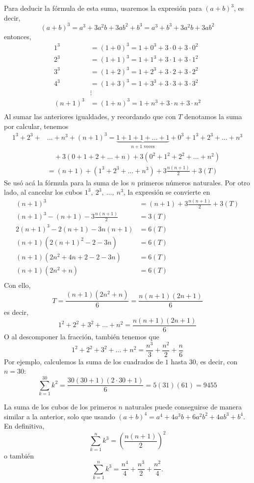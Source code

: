 Para deducir la fórmula de esta suma, usaremos la expresión para $(a+b)^3$, es decir,
\[
(a+b)^3=a^3+3a^2b+3ab^2+b^3=a^3+b^3+3a^2b+3ab^2
\]
entonces,
\begin{align*}
1^3&=(1+0)^3=1+0^3+3\cdot 0+3\cdot 0^2\\
2^3&=(1+1)^3=1+1^3+3\cdot 1+3\cdot 1^2\\
3^3&=(1+2)^3=1+2^3+3\cdot 2+3\cdot 2^2\\
4^3&=(1+3)^3=1+3^3+3\cdot 3+3\cdot 3^2\\
&\vdots \\
(n+1)^3&=(1+n)^3=1+n^3+3\cdot n+3\cdot n^2\\
\end{align*}
Al sumar las anteriores igualdades, y recordando que con $T$ denotamos la suma por calcular, tenemos
{\small
\begin{align*}
1^3+2^3+&\ldots+n^3+(n+1)^3=\underbrace{1+1+1+\ldots+1}_{\text{$n+1$ veces}}+0^3+1^3+2^3+\ldots+n^3\\
&\quad+3(0+1+2+\ldots+n)+3(0^2+1^2+2^2+\ldots+n^2)\\
&=(n+1)+(1^3+2^3+\ldots+n^3)+3\frac{n(n+1)}{2}+3(T)
\end{align*}
}
Se usó acá la fórmula para la suma de los $n$ primeros números naturales. Por otro lado, al cancelar los cubos $1^3,\ 2^3,\ \ldots,\ n^3$, la expresión se convierte en
\begin{align*}
(n+1)^3&=(n+1)+3\frac{n(n+1)}{2}+3(T)\\
(n+1)^3-(n+1)-3\frac{n(n+1)}{2}&=3(T)\\
2(n+1)^3-2(n+1)-3n(n+1)&=6(T)\\
(n+1)\left(2(n+1)^2-2-3n\right)&=6(T)\\
(n+1)\left(2n^2+4n+2-2-3n\right)&=6(T)\\
(n+1)\left(2n^2+n\right)&=6(T)\\
\end{align*}
Con ello,
\[
T=\frac{(n+1)\left(2n^2+n\right)}{6}=\frac{n(n+1)(2n+1)}{6}
\]
es decir,
\[
1^{2}+2^{2}+3^{2}+\ldots +n^{2}=\frac{n(n+1)(2n+1)}{6}
\]
O al descomponer la fracción, también tenemos que
\[
1^{2}+2^{2}+3^{2}+\ldots +n^{2}=\frac{n^3}{3}+\frac{n^2}{2}+\frac{n}{6}
\]
Por ejemplo, calculemos la suma de los cuadrados de $1$ hasta $30$, es decir, con $n=30$:
{\small
\[
\sum_{k=1}^{30}k^2=\frac{30(30+1)(2\cdot30+1)}{6}=5(31)(61)=9455
\]
}
\begin{ejemplo}\label{SumaCubos}
\textnormal {La suma de los cubos de los primeros} $n$ \textnormal {naturales puede conseguirse de manera similar a la anterior, solo que usando $(a+b)^4=a^4+4a^3b+6a^2b^2+4ab^3+b^4$. En definitiva,
\[
\sum_{k=1}^{n}k^{3}=\left(\frac{n(n+1)}{2}\right)^2
\]
o también}
\[
\sum_{k=1}^{n}k^{3}=\frac{n^4}{4}+\frac{n^3}{2}+\frac{n^2}{4}.
\]

\end{ejemplo}

